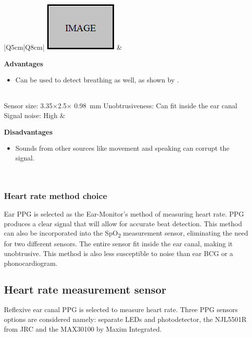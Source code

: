 \begin{table}[H]
\caption{Ear Phonocardiogram}
\label{tab:EarPhonocardiogram_Eval}
\renewcommand{\arraystretch}{1.3}
\centering
\begin{tabular}{|Q{5cm}|Q{8cm}|} 
\hline
\includegraphics[scale=0.8]{figs/Image.png} 		& 	

	\textbf{Advantages}
	\begin{itemize}[leftmargin=1em, noitemsep, topsep=2pt]	  
	\item Can be used to detect breathing as well, as shown by \cite{goverdovsky2016hearables}.
	\end{itemize}\\
	
\hline
Sensor size: 3.35$\times$2.5$\times$ \SI{0.98}{\milli\meter} \citep{Microphone}	\newline	
Unobtrusiveness: Can fit inside the ear canal  \newline	
Signal noise: High 	&
 
	\textbf{Disadvantages}
	\begin{itemize}[leftmargin=1em, noitemsep, topsep=2pt]
	\item Sounds from other sources like movement and speaking can corrupt the signal.
	\end{itemize}\\
 
 \hline
\end{tabular}
\end{table}

\subsubsection{Heart rate method choice}
Ear PPG is selected as the Ear-Monitor's method of measuring heart rate. PPG produces a clear signal that will allow for accurate beat detection. This method can also be incorporated into the SpO\textsubscript{2} measurement sensor, eliminating the need for two different sensors. The entire sensor fit inside the ear canal, making it unobtrusive. This method is also less susceptible to noise than ear BCG or a phonocardiogram.

\subsection{Heart rate measurement sensor}
Reflexive ear canal PPG is selected to measure heart rate. Three PPG sensors options are considered namely: separate LEDs and photodetector, the NJL5501R from JRC and the MAX30100 by Maxim Integrated.

